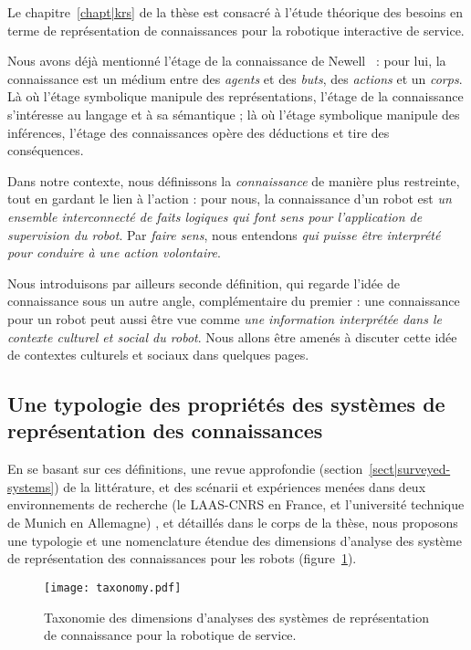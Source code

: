 Le chapitre~\ref{chapt|krs} de la thèse est consacré à l'étude théorique des
besoins en terme de représentation de connaissances pour la robotique
interactive de service.

Nous avons déjà mentionné \og l'étage de la connaissance \fg de
Newell~\cite{Newell1981} : pour lui, la connaissance est un médium entre des
\emph{agents} et des \emph{buts}, des \emph{actions} et un \emph{corps}. Là où
l'étage symbolique manipule des représentations, l'étage de la connaissance
s'intéresse au langage et à sa sémantique ; là où l'étage symbolique manipule
des inférences, l'étage des connaissances opère des déductions et tire des
conséquences.

Dans notre contexte, nous définissons la \emph{connaissance} de manière plus
restreinte, tout en gardant le lien à l'action : pour nous, la connaissance
d'un robot est \emph{un ensemble interconnecté de faits logiques qui font sens
pour l'application de supervision du robot}. Par \emph{faire sens}, nous
entendons \emph{qui puisse être interprété pour conduire à une action
volontaire}.

Nous introduisons par ailleurs seconde définition, qui regarde l'idée de
connaissance sous un autre angle, complémentaire du premier : une connaissance
pour un robot peut aussi être vue comme \emph{une information interprétée dans
le contexte culturel et social du robot}. Nous allons être amenés à discuter
cette idée de contextes culturels et sociaux dans quelques pages.

\subsection{Une typologie des propriétés des systèmes de représentation des connaissances}

En se basant sur ces définitions, une revue approfondie
(section~\ref{sect|surveyed-systems}) de la littérature, et des scénarii et
expériences menées dans deux environnements de recherche (le LAAS-CNRS en
France, et l'université technique de Munich en Allemagne) , et détaillés dans
le corps de la thèse, nous proposons une typologie et une nomenclature étendue
des dimensions d'analyse des système de représentation des connaissances pour
les robots (figure~\ref{fig|taxo}).

\begin{figure}
        \centering
        \texttt{[image: taxonomy.pdf]}
        \caption{Taxonomie des dimensions d'analyses des systèmes de 
        représentation de connaissance pour la robotique de service.}
        \label{fig|taxo}
\end{figure}

